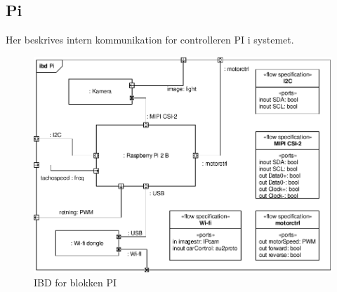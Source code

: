\subsection{Pi}

Her beskrives intern kommunikation for controlleren PI i systemet. 

\begin{figure}[h]
\centering
\includegraphics[scale=1]{../fig/diagrammer/bil/ibd_pi.pdf}
\caption{IBD for blokken PI}
\label{fig:ibd_pi}
\end{figure}
